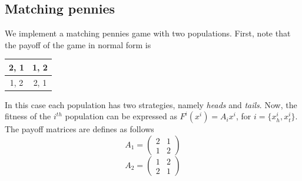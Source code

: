 \documentclass[a4paper,10pt]{article}
\begin{document}
\subsection{Matching pennies}
We implement a matching pennies game with two populations. First, note that the payoff of the game in normal form is
%
\begin{table}[h]
\centering
 \begin{tabular}{|c|c|} \hline
  2, 1 & 1, 2 \\ \hline
  1, 2 & 2, 1 \\ \hline
 \end{tabular}
\end{table}
%
In this case each population has two strategies, namely \emph{heads} and \emph{tails}.
Now, the fitness of the $i^{th}$ population can be expressed as $F^i(x^i) = A_i x^i$, for $i=\{x_h^i, x_t^i\}$. 
The payoff matrices are defines as follows
%
\begin{equation}
  A_1 = \begin{pmatrix}
2 & 1 \\
1 & 2 
  \end{pmatrix}
\end{equation}
%
\begin{equation}
  A_2 = \begin{pmatrix}
  1 & 2 \\
  2 & 1 
  \end{pmatrix}
\end{equation}
%
\end{document}
